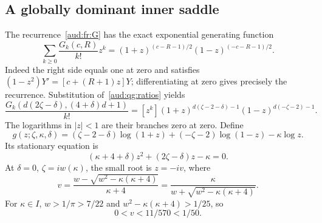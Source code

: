 \documentclass[11pt,a4paper]{article}
\numberwithin{equation}{section}
\begin{document}
\subsection{A globally dominant inner saddle}
The recurrence~\eqref{aud:fr:G} has the exact exponential generating function
\begin{equation}\label{aud:qg:EGFgeneral}
 \sum_{k\ge0}\frac{G_k(c,R)}{k!}z^k
 =(1+z)^{(c-R-1)/2}(1-z)^{(-c-R-1)/2}.
\end{equation}
Indeed the right side equals one at zero and satisfies
$(1-z^2)Y'=[c+(R+1)z]Y$; differentiating at zero gives precisely the recurrence. Substitution of~\eqref{aud:qg:ratios} yields
\begin{equation}\label{aud:qg:EGF}
 \frac{G_k(d(2\zeta-\delta),(4+\delta)d+1)}{k!}
 =[z^k](1+z)^{d(\zeta-2-\delta)-1}(1-z)^{d(-\zeta-2)-1}.
\end{equation}
The logarithms in $|z|<1$ are their branches zero at zero. Define
\begin{equation}\label{aud:qg:g}
 g(z;\zeta,\kappa,\delta)
 =(\zeta-2-\delta)\log(1+z)+(-\zeta-2)\log(1-z)-\kappa\log z.
\end{equation}
Its stationary equation is
\begin{equation}\label{aud:qg:innerquad}
 (\kappa+4+\delta)z^2+(2\zeta-\delta)z-\kappa=0.
\end{equation}
At $\delta=0$, $\zeta=iw(\kappa)$, the small root is $z=-iv$, where
\begin{equation}\label{aud:qg:v}
 v=\frac{w-\sqrt{w^2-\kappa(\kappa+4)}}{\kappa+4}
 =\frac{\kappa}{w+\sqrt{w^2-\kappa(\kappa+4)}}.
\end{equation}
For $\kappa\in I$, $w>1/\pi>7/22$ and $w^2-\kappa(\kappa+4)>1/25$, so
\[
 0<v<11/570<1/50.
\]
\end{document}
